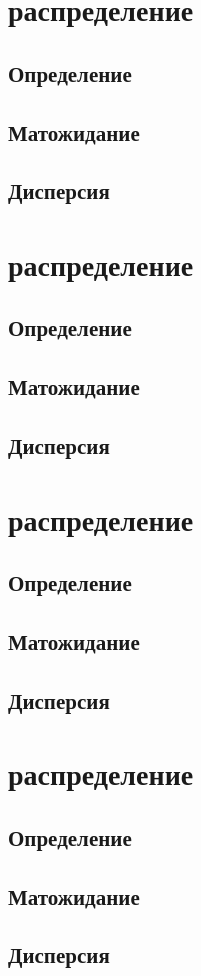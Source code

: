 \section{распределение}

\subsection{Определение}

\subsection{Матожидание}

\subsection{Дисперсия}

\section{распределение}

\subsection{Определение}

\subsection{Матожидание}

\subsection{Дисперсия}

\section{распределение}

\subsection{Определение}

\subsection{Матожидание}

\subsection{Дисперсия}

\section{распределение}

\subsection{Определение}

\subsection{Матожидание}

\subsection{Дисперсия}

